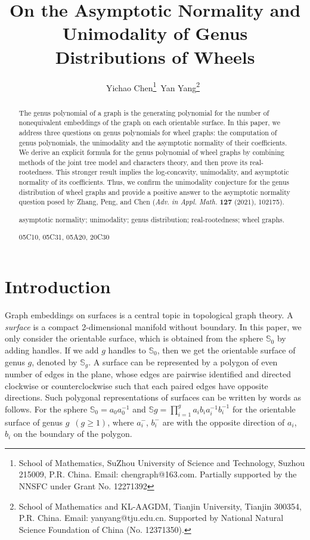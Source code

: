 \documentclass[12pt]{article}
\theoremstyle{definition}
\begin{document}
\title{On the Asymptotic Normality and Unimodality of Genus Distributions of Wheels}

\author{Yichao Chen\thanks{School of Mathematics, SuZhou University of Science and Technology, Suzhou 215009, P.R. China. Email: chengraph@163.com. Partially supported by the NNSFC under Grant No. 12271392}\,
\qquad
Yan Yang\thanks{School of Mathematics and KL-AAGDM, Tianjin University, Tianjin 300354, P.R. China. Email: yanyang@tju.edu.cn. Supported by National Natural Science Foundation of China (No. 12371350).} \,}

\date{}

\maketitle

 \begin{abstract}
The genus polynomial of a graph is the generating polynomial for the
number of nonequivalent embeddings of the graph on each orientable surface. In this paper, we address three questions  on
genus polynomials for wheel graphs: the computation of genus polynomials, the unimodality and the asymptotic normality of their coefficients. We derive an explicit formula for the genus polynomial of wheel graphs by
combining methods of the joint tree model and characters theory, and then prove its real-rootedness. This stronger result implies the log-concavity,
unimodality, and asymptotic normality of its coefficients. Thus, we
confirm the unimodality conjecture for the genus distribution of wheel graphs and provide a positive answer to
the asymptotic normality question  posed by Zhang, Peng, and Chen
(\emph{Adv. in Appl. Math.} \textbf{127} (2021), 102175).

\medskip
{} asymptotic normality; unimodality; genus distribution; real-rootedness; wheel graphs.

\smallskip
{} 05C10, 05C31, 05A20, 20C30
\end{abstract}



\section{Introduction}
Graph embeddings on surfaces is a central topic in topological graph theory. A {\it surface} is a compact 2-dimensional manifold without boundary. In this paper, we only consider  the orientable surface, which is obtained from the sphere $\mathbb{S}_0$ by adding handles. If we add $g$ handles to $\mathbb{S}_0$, then we get the orientable surface of genus $g$, denoted by $\mathbb{S}_g$. A surface can be represented by a polygon of even number of edges in the plane, whose edges are pairwise identified and directed clockwise or counterclockwise such that each paired edges have opposite directions. Such polygonal representations of surfaces can be written by words as follows. For the
sphere $\mathbb{S}_0=a_0a_0^{-1}$ and
 $\mathbb{S}{g}=\prod\limits_{i=1}^{g}a_{i}b_{i}a_{i}^{-1}b_{i}^{-1}$
for the orientable surface of genus $g$~$(g\geq 1)$, where $a_i^{-}$, $b_i^-$ are with the opposite direction of $a_i$, $b_i$ on the boundary of the polygon.
\end{document}

